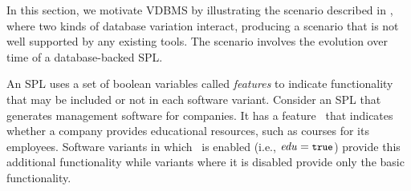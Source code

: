 


In this section, we motivate VDBMS by illustrating the scenario described in
, where two kinds of database variation interact, producing a
scenario that is not well supported by any existing tools. The scenario
involves the evolution over time of a database-backed SPL.


An SPL uses a set of boolean variables called \emph{features} 
to indicate functionality that may be included or not in each software
variant.
Consider an SPL that generates management software for companies. 
It has a feature \edu\ that 
indicates whether a company
provides educational resources, such as courses for its 
employees.
Software variants in which \edu\ is enabled (i.e., $\edu=\t$) provide this
additional functionality while variants where it is disabled provide only the
basic functionality.


